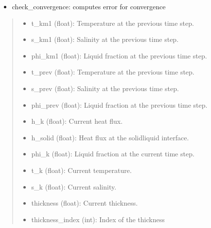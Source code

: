 \documentclass[a4paper,11pt,english,openany]{sphinxmanual}
\begin{document}
\begin{fulllineitems}
\begin{fulllineitems}
\begin{description}
\begin{itemize}
\item {} 
\sphinxAtStartPar
check\_convergence: computes error for convergence

\end{itemize}

\end{description}
\begin{quote}\begin{description}
\sphinxAtStartPar
\begin{description}
\begin{itemize}
\item {} 
\sphinxAtStartPar
t\_km1 (float): Temperature at the previous time step.

\item {} 
\sphinxAtStartPar
s\_km1 (float): Salinity at the previous time step.

\item {} 
\sphinxAtStartPar
phi\_km1 (float): Liquid fraction at the previous time step.

\item {} 
\sphinxAtStartPar
t\_prev (float): Temperature at the previous time step.

\item {} 
\sphinxAtStartPar
s\_prev (float): Salinity at the previous time step.

\item {} 
\sphinxAtStartPar
phi\_prev (float): Liquid fraction at the previous time step.

\item {} 
\sphinxAtStartPar
h\_k (float): Current heat flux.

\item {} 
\sphinxAtStartPar
h\_solid (float): Heat flux at the solid\sphinxhyphen{}liquid interface.

\item {} 
\sphinxAtStartPar
phi\_k (float): Liquid fraction at the current time step.

\item {} 
\sphinxAtStartPar
t\_k (float): Current temperature.

\item {} 
\sphinxAtStartPar
s\_k (float): Current salinity.

\item {} 
\sphinxAtStartPar
thickness (float): Current thickness.

\item {} 
\sphinxAtStartPar
thickness\_index (int): Index of the thickness


\end{itemize}
\end{description}
\end{description}
\end{quote}
\end{fulllineitems}
\end{fulllineitems}
\end{document}
